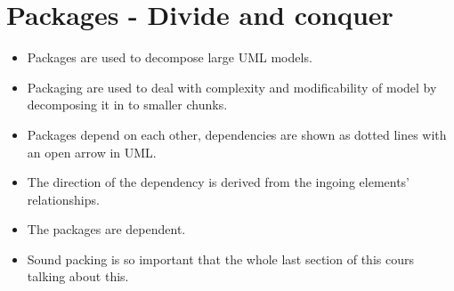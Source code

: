 \section{Packages - Divide and conquer}
\begin{itemize}
    \item Packages are used to decompose large UML models.
    \item Packaging are used to deal with complexity and modificability of model by decomposing it in to smaller chunks. 
    \item Packages depend on each other, dependencies are shown as dotted lines with an open arrow in UML. 
    \item The direction of the dependency is derived from the ingoing elements' relationships. 
    \item The packages are dependent.
    \item Sound packing is so important that the whole last section of this cours talking about this. 
\end{itemize}

